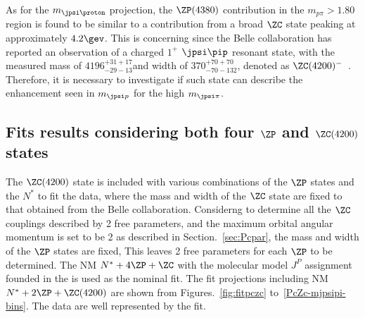 As for the $m_{\jpsi\proton}$ projection, 
the $\ZP(4380)$ contribution in the $m_{p\pi}>1.80$\gev region is found to be similar to a contribution 
from a broad $\ZC$  state peaking at approximately $4.2\gev$. 
This is concerning since the Belle collaboration has reported an observation of a charged $1^+$ $\jpsi \pip$ resonant state, 
with the measured mass of $4196_{-29-13}^{+31+17}$\mev and width of $370_{-70-132}^{+70+70}$\mev, 
denoted as $\ZC(4200)^-$~\supercite{Chilikin:2014bkk}.  
Therefore,
it is necessary to investigate if such state can describe the enhancement seen in $m_{\jpsi p}$ for the high $m_{\jpsi\pi}$. 



\subsection{{Fits results considering both four $\ZP$ and $\ZC(4200)$ states}}
The $\ZC(4200)$ state is included with various combinations of the $\ZP$ states and the $N^*$ to fit the data, 
where the mass and width of the $\ZC$ state are fixed to that obtained from the Belle collaboration.  
Considerng to determine all the $\ZC$ couplings described by 2 free parameters,
and the maximum orbital angular momentum is set to be 2 
as described in Section.~\ref{sec:Pcpar}, 
the mass and width of the $\ZP$ states are fixed,
This leaves 2 free parameters for each $\ZP$ to be determined. 
The NM $N^*+4\ZP+\ZC$ with the molecular model $J^P$ assignment founded in the \LbJpsipK is used as the nominal fit.
The fit projections including NM $N^*+2\ZP+\ZC(4200)$ are shown from Figures.~\ref{fig:fitpczc} to~\ref{PcZc-mjpsipi-bins}. 
The data are well represented by the fit.


